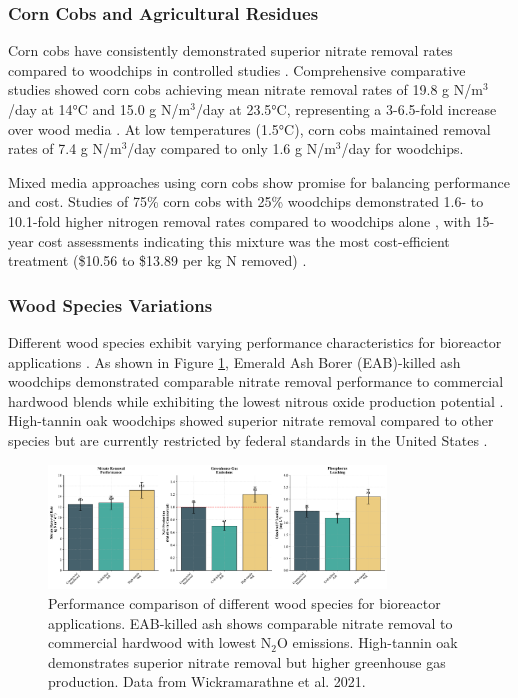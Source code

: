 \documentclass[12pt,a4paper]{article}
\begin{document}
\subsubsection{Corn Cobs and Agricultural Residues}

Corn cobs have consistently demonstrated superior nitrate removal rates compared to woodchips in controlled studies \citep{RN350, RN624}. Comprehensive comparative studies showed corn cobs achieving mean nitrate removal rates of 19.8 g N/m$^3$/day at 14°C and 15.0 g N/m$^3$/day at 23.5°C, representing a 3-6.5-fold increase over wood media \citep{RN350, RN624}. At low temperatures (1.5°C), corn cobs maintained removal rates of 7.4 g N/m$^3$/day compared to only 1.6 g N/m$^3$/day for woodchips.

Mixed media approaches using corn cobs show promise for balancing performance and cost. Studies of 75\% corn cobs with 25\% woodchips demonstrated 1.6- to 10.1-fold higher nitrogen removal rates compared to woodchips alone \citep{RN350}, with 15-year cost assessments indicating this mixture was the most cost-efficient treatment (\$10.56 to \$13.89 per kg N removed) \citep{RN350}.

\subsubsection{Wood Species Variations}

Different wood species exhibit varying performance characteristics for bioreactor applications \citep{RN611}. As shown in Figure \ref{fig:wood_species_comparison}, Emerald Ash Borer (EAB)-killed ash woodchips demonstrated comparable nitrate removal performance to commercial hardwood blends while exhibiting the lowest nitrous oxide production potential \citep{RN611}. High-tannin oak woodchips showed superior nitrate removal compared to other species but are currently restricted by federal standards in the United States \citep{RN611}.

\begin{figure}[ht]
\centering
\includegraphics[width=0.8\textwidth]{fig9_wood_species_comparison_scientific}
\caption{Performance comparison of different wood species for bioreactor applications. EAB-killed ash shows comparable nitrate removal to commercial hardwood with lowest N$_2$O emissions. High-tannin oak demonstrates superior nitrate removal but higher greenhouse gas production. Data from Wickramarathne et al. 2021.}
\label{fig:wood_species_comparison}
\end{figure}
\end{document}
